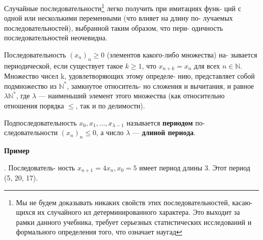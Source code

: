 \documentclass{../template/mai_book}
\begin{document}
\noindent Случайные последовательности\footnote{Мы не будем доказывать никаких свойств этих последовательностей, касаю- \linebreak щихся их случайного ил детерминированного характера. Это выходит за рамки \linebreak данного учебника, требует серьезных статистических исследований и формального \linebreak определения того, что означает \guillemotleft наугад\guillemotright \;} легко получить при имитациях функ- \linebreak ций с одной или несколькими переменными (что влияет на длину по- \linebreak лучаемых последовательностей), выбранной таким образом, что пери- \linebreak одичность последовательностей неочевидна.

\begin{determ}
Последовательность $(x_{n})_{n}\geqslant 0$ (элементов какого-либо множества) на- \linebreak зывается периодической, если существует такое $k\geqslant 1$, что $x_{n+k} = x_{n}$ \linebreak для всех $n \in \mathbb{N}.$ Множество чисел k, удовлетворяющих этому определе- \linebreak нию, представляет собой подмножество из $\mathbb{N}^{*}$, замкнутое относитель- \linebreak но сложения и вычитания, и равное $\lambda \mathbb{N}^{*}$, где $\lambda$ --- наименьший элемент
 \newpage 
\noindent этого множества (как относительно отношения порядка $\leqslant$, так и по \linebreak делимости). \par 
Подпоследовательность $x_{0}, x_{1},..., x_{\lambda - 1}$ называется \textbf{периодом} по- \linebreak следовательности $(x_{n})_{n} \leqslant 0$, а число $\lambda$ --- \textbf{длиной периода}.
\end{determ}
\noindent\textbf{Пример} \par
{}. Последователь- \linebreak ность $x_{n+1} = 4x_{n}, x_{0} = 5$ имеет период длины 3. Этот период \linebreak (5, 20, 17).
\end{document}
